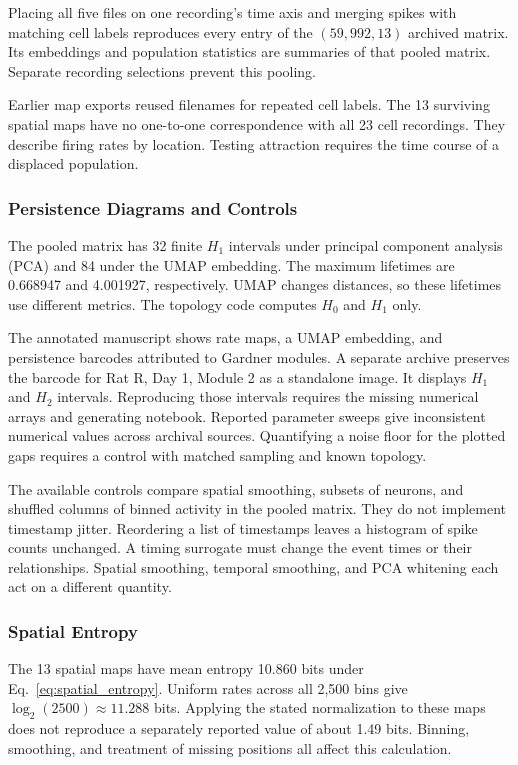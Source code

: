 \documentclass[12pt,a4paper]{article}
\begin{document}
Placing all five files on one recording's time axis and merging spikes with matching cell labels reproduces every entry of the $(59{,}992,13)$ archived matrix. Its embeddings and population statistics are summaries of that pooled matrix. Separate recording selections prevent this pooling.

Earlier map exports reused filenames for repeated cell labels. The 13 surviving spatial maps have no one-to-one correspondence with all 23 cell recordings. They describe firing rates by location. Testing attraction requires the time course of a displaced population.

\subsubsection{Persistence Diagrams and Controls}\label{sec:homology_reporting}

The pooled matrix has 32 finite $H_1$ intervals under principal component analysis (PCA) and 84 under the UMAP embedding. The maximum lifetimes are 0.668947 and 4.001927, respectively. UMAP changes distances, so these lifetimes use different metrics. The topology code computes $H_0$ and $H_1$ only.

The annotated manuscript shows rate maps, a UMAP embedding, and persistence barcodes attributed to Gardner modules. A separate archive preserves the barcode for Rat R, Day 1, Module 2 as a standalone image. It displays $H_1$ and $H_2$ intervals. Reproducing those intervals requires the missing numerical arrays and generating notebook. Reported parameter sweeps give inconsistent numerical values across archival sources. Quantifying a noise floor for the plotted gaps requires a control with matched sampling and known topology.

The available controls compare spatial smoothing, subsets of neurons, and shuffled columns of binned activity in the pooled matrix. They do not implement timestamp jitter. Reordering a list of timestamps leaves a histogram of spike counts unchanged. A timing surrogate must change the event times or their relationships. Spatial smoothing, temporal smoothing, and PCA whitening each act on a different quantity.

\subsubsection{Spatial Entropy}

The 13 spatial maps have mean entropy 10.860 bits under Eq.~\eqref{eq:spatial_entropy}. Uniform rates across all 2,500 bins give $\log_2(2500)\approx11.288$ bits. Applying the stated normalization to these maps does not reproduce a separately reported value of about 1.49 bits. Binning, smoothing, and treatment of missing positions all affect this calculation.
\end{document}
